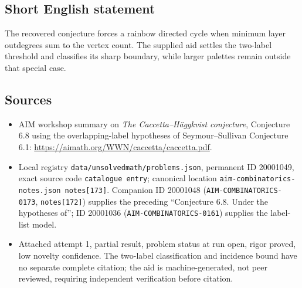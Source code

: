 \documentclass[11pt]{article}
\begin{document}
\subsection{Short English statement}
The recovered conjecture forces a rainbow directed cycle when minimum layer outdegrees sum to the vertex count. The supplied aid settles the two-label threshold and classifies its sharp boundary, while larger palettes remain outside that special case.
\subsection{Sources}
\begin{itemize}
\item AIM workshop summary on \emph{The Caccetta--H\"aggkvist conjecture}, Conjecture 6.8 using the overlapping-label hypotheses of Seymour--Sullivan Conjecture 6.1: \url{https://aimath.org/WWN/caccetta/caccetta.pdf}.
\item Local registry \texttt{data/unsolvedmath/problems.json}, permanent ID 20001049, exact source code \texttt{catalogue entry}; canonical location \texttt{aim-combinatorics-notes.json notes[173]}. Companion ID 20001048 (\texttt{AIM-COMBINATORICS-0173}, \texttt{notes[172]}) supplies the preceding ``Conjecture 6.8. Under the hypotheses of''; ID 20001036 (\texttt{AIM-COMBINATORICS-0161}) supplies the label-list model.
\item Attached attempt 1, partial result, problem status at run open, rigor proved, low novelty confidence. The two-label classification and incidence bound have no separate complete citation; the aid is machine-generated, not peer reviewed, requiring independent verification before citation.
\end{itemize}
\end{document}

